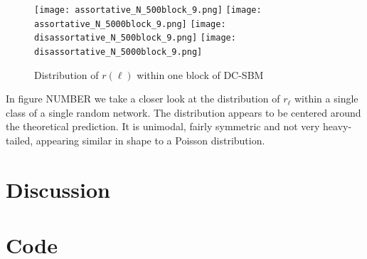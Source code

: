 \documentclass[12pt]{article}
\begin{document}
\begin{figure}[h!]
\texttt{[image: assortative\_N\_500block\_9.png]}
\texttt{[image: assortative\_N\_5000block\_9.png]}
\texttt{[image: disassortative\_N\_500block\_9.png]}
\texttt{[image: disassortative\_N\_5000block\_9.png]}
\caption{Distribution of $r(\ell)$ within one block of DC-SBM}
\end{figure}

In figure NUMBER we take a closer look at the distribution of $r_\ell$ within a single class of a single random network.  The distribution appears to be centered around the theoretical prediction.  It is unimodal, fairly symmetric and not very heavy-tailed, appearing similar in shape to a Poisson distribution.

\section{Discussion}


\section*{Code}
\end{document}

